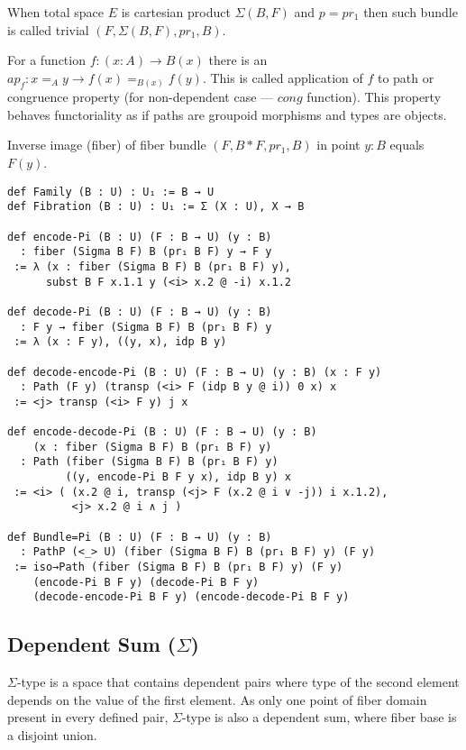 \documentclass{article}
\begin{document}
\begin{definition}
When total space $E$ is cartesian product $\Sigma(B,F)$ and $p = pr_1$
then such bundle is called trivial $(F,\Sigma(B,F),pr_1,B)$.
\end{definition}

\begin{theorem}
For a function $f: (x:A) \rightarrow B(x)$
there is an $ap_f : x =_A y \rightarrow f(x) =_{B(x)} f(y)$. This is called
application of $f$ to path or congruence property (for non-dependent case ---
$cong$ function). This property behaves functoriality
as if paths are groupoid morphisms and types are objects.
\end{theorem}

\begin{theorem}
Inverse image (fiber) of fiber bundle $(F,B*F,pr_1,B)$ in point $y:B$ equals $F(y)$.
\begin{lstlisting}[mathescape=true]
def Family (B : U) : U₁ := B → U
def Fibration (B : U) : U₁ := Σ (X : U), X → B

def encode-Pi (B : U) (F : B → U) (y : B)
  : fiber (Sigma B F) B (pr₁ B F) y → F y
 := λ (x : fiber (Sigma B F) B (pr₁ B F) y),
      subst B F x.1.1 y (<i> x.2 @ -i) x.1.2

def decode-Pi (B : U) (F : B → U) (y : B)
  : F y → fiber (Sigma B F) B (pr₁ B F) y
 := λ (x : F y), ((y, x), idp B y)

def decode-encode-Pi (B : U) (F : B → U) (y : B) (x : F y)
  : Path (F y) (transp (<i> F (idp B y @ i)) 0 x) x
 := <j> transp (<i> F y) j x

def encode-decode-Pi (B : U) (F : B → U) (y : B)
    (x : fiber (Sigma B F) B (pr₁ B F) y)
  : Path (fiber (Sigma B F) B (pr₁ B F) y)
         ((y, encode-Pi B F y x), idp B y) x
 := <i> ( (x.2 @ i, transp (<j> F (x.2 @ i ∨ -j)) i x.1.2),
          <j> x.2 @ i ∧ j )

def Bundle=Pi (B : U) (F : B → U) (y : B)
  : PathP (<_> U) (fiber (Sigma B F) B (pr₁ B F) y) (F y)
 := iso→Path (fiber (Sigma B F) B (pr₁ B F) y) (F y)
    (encode-Pi B F y) (decode-Pi B F y)
    (decode-encode-Pi B F y) (encode-decode-Pi B F y)
\end{lstlisting}
\end{theorem}

\subsection{Dependent Sum ($\Sigma$)}
$\Sigma$-type is a space that contains dependent pairs
where type of the second element depends on the value
of the first element. As only one point of fiber domain
present in every defined pair, $\Sigma$-type is also a dependent sum,
where fiber base is a disjoint union.
\end{document}
